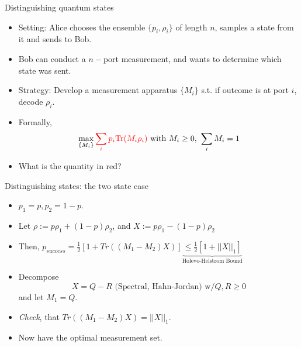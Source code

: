 \documentclass[handout]{beamer}
\begin{document}
\begin{frame}{Distinguishing quantum states}
    \begin{itemize}
        \item Setting: Alice chooses the ensemble $\{p_i,\rho_i\}$ of length $n$, samples a state from it and sends to Bob. \pause 
        \item Bob can conduct a $n-$port measurement, and wants to determine which state was sent. \pause 
        \item Strategy: Develop a measurement apparatus $\{M_i\}$ s.t. if outcome is at port $i$, decode $\rho_i$.\pause 
        \item Formally,
        \begin{equation}
            \max_{\{M_i\}}\textcolor{red}{\sum_ip_i\text{Tr}(M_i\rho_i)} \text{ with } M_i \geq 0,~\sum_iM_i = 1
        \end{equation}\pause 
        \item What is the quantity in red?
    \end{itemize}
\end{frame}
\begin{frame}{Distinguishing states: the two state case}
    \begin{itemize}
        \item $p_1 = p, p_2 = 1-p$.\pause
        \item Let $\rho := p\rho_1 + (1-p)\rho_2$, and $X := p\rho_1 - (1-p)\rho_2$\pause
        \item Then,
        $p_{success} = \frac{1}{2}\left[1 + Tr((M_1-M_2)X)\right] \underbrace{\leq \frac{1}{2}\left[1 + ||X||_1\right]}_{\text{Holevo-Helstrom Bound}}$\pause
        \item Decompose
        \begin{equation}
            X = Q - R \text{ (Spectral, Hahn-Jordan) w/} Q,R \geq 0
        \end{equation}
        and let $M_1 = Q$. \pause
        \item \textit{Check}, that $Tr((M_1-M_2)X) = ||X||_1$. 
        \item Now have the optimal measurement set.
    \end{itemize}
\end{frame}
\end{document}
